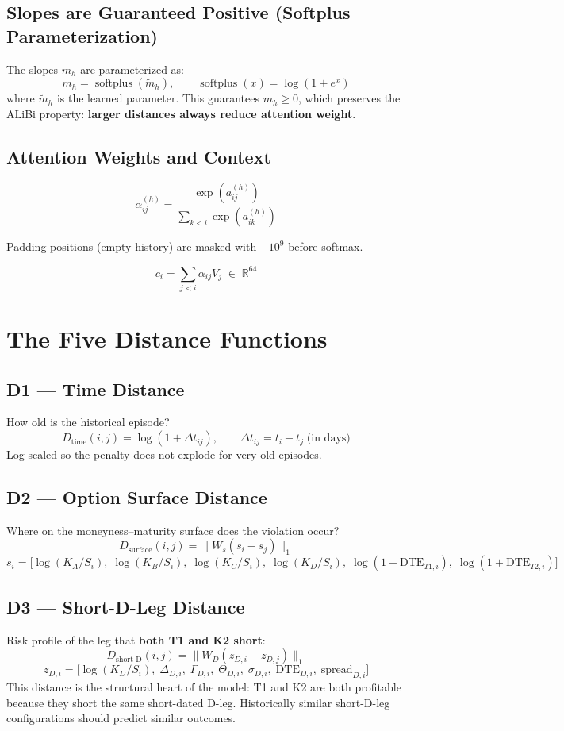 \documentclass[11pt]{article}
\newcommand{\R}{\mathbb{R}}
\newcommand{\1}{\mathbf{1}}
\newcommand{\softplus}{\operatorname{softplus}}
\begin{document}
\subsection{Slopes are Guaranteed Positive (Softplus Parameterization)}

The slopes $m_h$ are parameterized as:
\[
  m_h = \softplus(\tilde{m}_h),
  \qquad
  \softplus(x) = \log(1 + e^x)
\]
where $\tilde{m}_h$ is the learned parameter. This guarantees $m_h \geq 0$,
which preserves the ALiBi property: \textbf{larger distances always reduce
attention weight}.

\subsection{Attention Weights and Context}

\[
  \alpha_{ij}^{(h)}
  =
  \frac{\exp(a_{ij}^{(h)})}{\sum_{k < i} \exp(a_{ik}^{(h)})}
\]

Padding positions (empty history) are masked with $-10^9$ before softmax.

\[
  c_i
  =
  \sum_{j < i} \alpha_{ij} V_j
  \;\in\; \R^{64}
\]

\section{The Five Distance Functions}

\subsection{D1 --- Time Distance}
How old is the historical episode?
\[
  D_{\mathrm{time}}(i,j)
  =
  \log(1 + \Delta t_{ij}),
  \qquad
  \Delta t_{ij} = t_i - t_j \;\text{(in days)}
\]
Log-scaled so the penalty does not explode for very old episodes.

\subsection{D2 --- Option Surface Distance}
Where on the moneyness--maturity surface does the violation occur?
\[
  D_{\mathrm{surface}}(i,j)
  =
  \bigl\|W_s(s_i - s_j)\bigr\|_1
\]
\[
  s_i
  =
  \bigl[
    \log(K_A/S_i),\;
    \log(K_B/S_i),\;
    \log(K_C/S_i),\;
    \log(K_D/S_i),\;
    \log(1 + \mathrm{DTE}_{T1,i}),\;
    \log(1 + \mathrm{DTE}_{T2,i})
  \bigr]
\]

\subsection{D3 --- Short-D-Leg Distance}
Risk profile of the leg that \textbf{both T1 and K2 short}:
\[
  D_{\mathrm{short\text{-}D}}(i,j)
  =
  \bigl\|W_D(z_{D,i} - z_{D,j})\bigr\|_1
\]
\[
  z_{D,i}
  =
  \bigl[
    \log(K_D/S_i),\;
    \Delta_{D,i},\;
    \Gamma_{D,i},\;
    \Theta_{D,i},\;
    \sigma_{D,i},\;
    \mathrm{DTE}_{D,i},\;
    \mathrm{spread}_{D,i}
  \bigr]
\]
This distance is the structural heart of the model: T1 and K2 are both
profitable because they short the same short-dated D-leg. Historically similar
short-D-leg configurations should predict similar outcomes.
\end{document}
